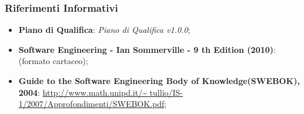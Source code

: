 		\subsubsection{Riferimenti Informativi}
			\begin{itemize}
				\item \textbf{Piano di Qualifica}: \textit{Piano di Qualifica v1.0.0};
				\item \textbf{Software Engineering - Ian Sommerville - 9 th Edition (2010)}: (formato cartaceo);
				\item \textbf{Guide to the Software Engineering Body of Knowledge(SWEBOK), 2004}: \url{http://www.math.unipd.it/~	tullio/IS-1/2007/Approfondimenti/SWEBOK.pdf};
			\end{itemize}
